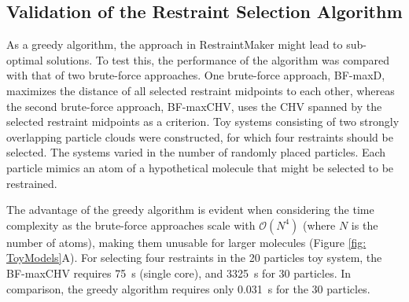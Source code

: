 
\subsection{Validation of the Restraint Selection Algorithm}
As a greedy algorithm, the approach in RestraintMaker might lead to sub-optimal solutions. To test this, the performance of the algorithm was compared with that of two brute-force approaches. One brute-force approach, BF-maxD, maximizes the distance of all selected restraint midpoints to each other, whereas the second brute-force approach, BF-maxCHV, uses the CHV spanned by the selected restraint midpoints as a criterion. Toy systems consisting  of two strongly overlapping particle clouds were constructed, for which four restraints should be selected. The systems varied in the number of randomly placed particles. Each particle mimics an atom of a hypothetical molecule that might be selected to be restrained.

The advantage of the greedy algorithm is evident when considering the time complexity as the brute-force approaches scale with $\mathcal O(N^4)$ (where $N$ is the number of atoms), making them unusable for larger molecules (Figure \ref{fig: ToyModels}A). For selecting four restraints in the 20 particles toy system, the BF-maxCHV requires 75~s (single core), and 3325~s for 30 particles. In comparison, the greedy algorithm requires only 0.031~s for the 30 particles.

